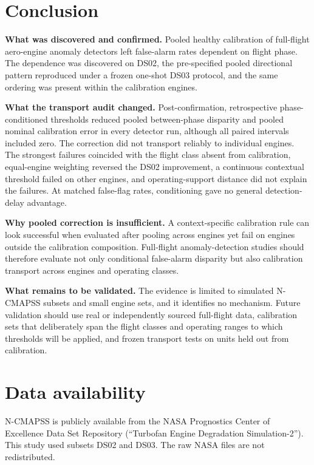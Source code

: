 \documentclass[preprint,11pt,a4paper]{elsarticle}
\begin{document}
\section{Conclusion}

\textbf{What was discovered and confirmed.} Pooled healthy calibration of full-flight aero-engine anomaly detectors left false-alarm rates dependent on flight phase. The dependence was discovered on DS02, the pre-specified pooled directional pattern reproduced under a frozen one-shot DS03 protocol, and the same ordering was present within the calibration engines.

\textbf{What the transport audit changed.} Post-confirmation, retrospective phase-conditioned thresholds reduced pooled between-phase disparity and pooled nominal calibration error in every detector run, although all paired intervals included zero. The correction did not transport reliably to individual engines. The strongest failures coincided with the flight class absent from calibration, equal-engine weighting reversed the DS02 improvement, a continuous contextual threshold failed on other engines, and operating-support distance did not explain the failures. At matched false-flag rates, conditioning gave no general detection-delay advantage.

\textbf{Why pooled correction is insufficient.} A context-specific calibration rule can look successful when evaluated after pooling across engines yet fail on engines outside the calibration composition. Full-flight anomaly-detection studies should therefore evaluate not only conditional false-alarm disparity but also calibration transport across engines and operating classes.

\textbf{What remains to be validated.} The evidence is limited to simulated N-CMAPSS subsets and small engine sets, and it identifies no mechanism. Future validation should use real or independently sourced full-flight data, calibration sets that deliberately span the flight classes and operating ranges to which thresholds will be applied, and frozen transport tests on units held out from calibration.

\section*{Data availability}

N-CMAPSS is publicly available from the NASA Prognostics Center of Excellence Data Set Repository (``Turbofan Engine Degradation Simulation-2''). This study used subsets DS02 and DS03. The raw NASA files are not redistributed.
\end{document}
